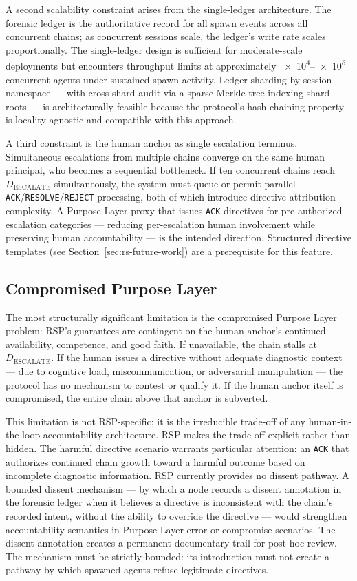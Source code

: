 A second scalability constraint arises from the single-ledger architecture. The forensic ledger is the authoritative record for all spawn events across all concurrent chains; as concurrent sessions scale, the ledger's write rate scales proportionally. The single-ledger design is sufficient for moderate-scale deployments but encounters throughput limits at approximately \numrange{e4}{e5} concurrent agents under sustained spawn activity. Ledger sharding by session namespace — with cross-shard audit via a sparse Merkle tree indexing shard roots — is architecturally feasible because the protocol's hash-chaining property is locality-agnostic and compatible with this approach.

A third constraint is the human anchor as single escalation terminus. Simultaneous escalations from multiple chains converge on the same human principal, who becomes a sequential bottleneck. If ten concurrent chains reach $D_{\text{ESCALATE}}$ simultaneously, the system must queue or permit parallel \texttt{ACK}/\texttt{RESOLVE}/\texttt{REJECT} processing, both of which introduce directive attribution complexity. A Purpose Layer proxy that issues \texttt{ACK} directives for pre-authorized escalation categories — reducing per-escalation human involvement while preserving human accountability — is the intended direction. Structured directive templates (see Section~\ref{sec:rs-future-work}) are a prerequisite for this feature.

\subsection{Compromised Purpose Layer}
\label{sec:rs-purpose-compromise}

The most structurally significant limitation is the compromised Purpose Layer problem: RSP's guarantees are contingent on the human anchor's continued availability, competence, and good faith. If unavailable, the chain stalls at $D_{\text{ESCALATE}}$. If the human issues a directive without adequate diagnostic context — due to cognitive load, miscommunication, or adversarial manipulation — the protocol has no mechanism to contest or qualify it. If the human anchor itself is compromised, the entire chain above that anchor is subverted.

This limitation is not RSP-specific; it is the irreducible trade-off of any human-in-the-loop accountability architecture. RSP makes the trade-off explicit rather than hidden. The harmful directive scenario warrants particular attention: an \texttt{ACK} that authorizes continued chain growth toward a harmful outcome based on incomplete diagnostic information. RSP currently provides no dissent pathway. A bounded dissent mechanism — by which a node records a dissent annotation in the forensic ledger when it believes a directive is inconsistent with the chain's recorded intent, without the ability to override the directive — would strengthen accountability semantics in Purpose Layer error or compromise scenarios. The dissent annotation creates a permanent documentary trail for post-hoc review. The mechanism must be strictly bounded: its introduction must not create a pathway by which spawned agents refuse legitimate directives.

